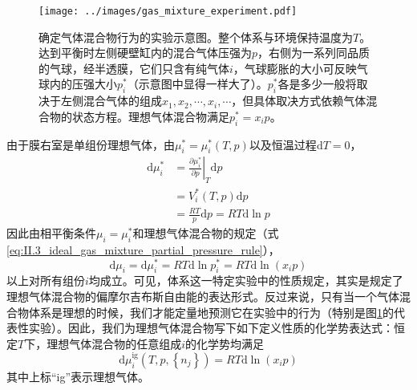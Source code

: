 \documentclass[main.tex]{subfiles}
\begin{document}
\begin{figure}[ht]
    \centering
    \texttt{[image: ../images/gas\_mixture\_experiment.pdf]}
    \caption{确定气体混合物行为的实验示意图。整个体系与环境保持温度为$T$。达到平衡时左侧硬壁缸内的混合气体压强为$p$，右侧为一系列同品质的气球，经半透膜，它们只含有纯气体$i$，气球膨胀的大小可反映气球内的压强大小$p^*_i$（示意图中显得一样大了）。$p^*_i$各是多少一般将取决于左侧混合气体的组成$x_1,x_2,\cdots,x_i,\cdots$，但具体取决方式依赖气体混合物的状态方程。理想气体混合物满足$p^*_i=x_ip$。}
    \label{fig:gas_mixture_experiment}
\end{figure}

由于膜右室是单组份理想气体，由$\mu_i^*=\mu_i^*\left(T,p\right)$以及恒温过程$\mathrm{d}T=0$，
\begin{align*}
    \mathrm{d}\mu_i^* & =\left.\frac{\partial\mu_i^*}{\partial p}\right|_{T}\mathrm{d}p \\
                      & =V_i^*\left(T,p\right)\mathrm{d}p                               \\
                      & =\frac{RT}{p}\mathrm{d}p=RT\mathrm{d}\ln p
\end{align*}
因此由相平衡条件$\mu_i=\mu_i^*$和理想气体混合物的规定（式\eqref{eq:II.3_ideal_gas_mixture_partial_pressure_rule}），
\[\mathrm{d}\mu_i=\mathrm{d}\mu_i^*=RT\mathrm{d}\ln p_i^*=RT\mathrm{d}\ln\left(x_ip\right)\]
以上对所有组份$i$均成立。可见，体系这一特定实验中的性质规定，其实是规定了理想气体混合物的偏摩尔吉布斯自由能的表达形式。反过来说，只有当一个气体混合物体系是理想的时候，我们才能定量地预测它在实验中的行为（特别是图\ref{fig:gas_mixture_experiment}的代表性实验）。因此，我们为理想气体混合物写下如下定义性质的化学势表达式：恒定$T$下，理想气体混合物的任意组成$i$的化学势均满足
\begin{equation}\label{eq:II.3_def_ideal_gas_mixture_mu}
    \mathrm{d}\mu_i^\text{ig}\left(T,p,\left\{n_j\right\}\right)=RT\mathrm{d}\ln\left(x_i p\right)
\end{equation}
其中上标“ig”表示理想气体。
\end{document}
